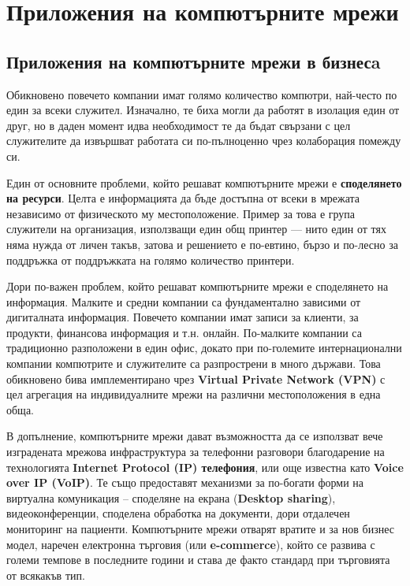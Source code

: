 \documentclass[9pt,a4paper,oneside]{extbook}
\begin{document}
\section{Приложения на компютърните мрежи}

\subsection{Приложения на компютърните мрежи в бизнесa}

Обикновено повечето компании имат голямо количество компютри, най-често по един
за всеки служител. Изначално, те биха могли да работят в изолация един от друг,
но в даден момент идва необходимост те да бъдат свързани с цел служителите да
извършват работата си по-пълноценно чрез колаборация помежду си.

Един от основните проблеми, който решават компютърните мрежи е
\textbf{споделянето на ресурси}. Целта е информацията да бъде достъпна от всеки
в мрежата независимо от физическото му местоположение. Пример за това е група
служители на организация, използващи един общ принтер --- нито един от тях няма
нужда от личен такъв, затова и решението е по-евтино, бързо и по-лесно за
поддръжка от поддръжката на голямо количество принтери.

Дори по-важен проблем, който решават компютърните мрежи е споделянето на
информация. Малките и средни компании са фундаментално зависими от дигиталната
информация. Повечето компании имат записи за клиенти, за продукти, финансова
информация и т.н. онлайн. По-малките компании са традиционно разположени в един
офис, докато при по-големите интернационални компании компютрите и служителите
са разпрострени в много държави. Това обикновено бива имплементирано чрез
\textbf{Virtual Private Network (VPN)} с цел агрегация на
индивидуалните мрежи на различни местоположения в една обща.

В допълнение, компютърните мрежи дават възможността да се използват вече
изградената мрежова инфраструктура за телефонни разговори благодарение на 
технологията \textbf{Internet Protocol (IP) телефония}, или още известна като
\textbf{Voice over IP (VoIP)}. Те също предоставят механизми за по-богати
форми на виртуална комуникация -- споделяне на екрана (\textbf{Desktop sharing}),
видеоконференции, споделена обработка на документи, дори отдалечен мониторинг
на пациенти. Компютърните мрежи отварят вратите и за нов бизнес модел, наречен
електронна търговия (или \textbf{e-commerce}), който се развива с големи темпове в
последните години и става де факто стандард при търговията от всякакъв тип.
\end{document}
